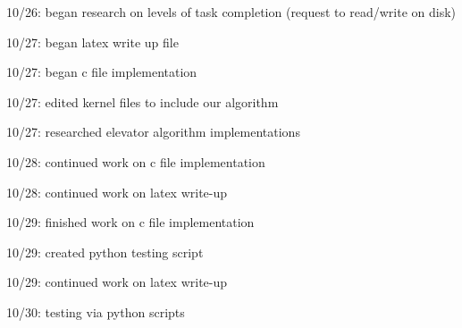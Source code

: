 \documentclass[onecolumn, draftclsnofoot,10pt, compsoc]{IEEEtran}
\begin{document}
	10/26: began research on levels of task completion (request to read/write on disk)
	
	10/27: began latex write up file
	
	10/27: began c file implementation
	
	10/27: edited kernel files to include our algorithm
	
	10/27: researched elevator algorithm implementations
	
	10/28: continued work on c file implementation
	
	10/28: continued work on latex write-up
	
	10/29: finished work on c file implementation
	
	10/29: created python testing script
	
	10/29: continued work on latex write-up
	
	10/30: testing via python scripts
\end{document}
